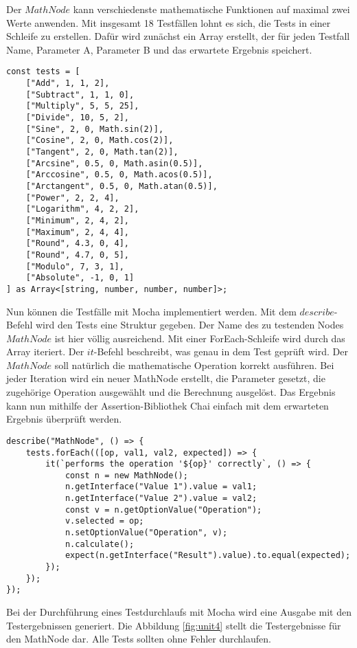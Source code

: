 Der $MathNode$ kann verschiedenste mathematische Funktionen auf maximal zwei Werte anwenden. Mit insgesamt 18 Testfällen lohnt es sich, die Tests in einer Schleife zu erstellen. Dafür wird zunächst ein Array erstellt, der für jeden Testfall Name, Parameter A, Parameter B und das erwartete Ergebnis speichert.

\begin{lstlisting}[caption=Unit-Test: Testdefinition,label=unit2]
const tests = [
    ["Add", 1, 1, 2],
    ["Subtract", 1, 1, 0],
    ["Multiply", 5, 5, 25],
    ["Divide", 10, 5, 2],
    ["Sine", 2, 0, Math.sin(2)],
    ["Cosine", 2, 0, Math.cos(2)],
    ["Tangent", 2, 0, Math.tan(2)],
    ["Arcsine", 0.5, 0, Math.asin(0.5)],
    ["Arccosine", 0.5, 0, Math.acos(0.5)],
    ["Arctangent", 0.5, 0, Math.atan(0.5)],
    ["Power", 2, 2, 4],
    ["Logarithm", 4, 2, 2],
    ["Minimum", 2, 4, 2],
    ["Maximum", 2, 4, 4],
    ["Round", 4.3, 0, 4],
    ["Round", 4.7, 0, 5],
    ["Modulo", 7, 3, 1],
    ["Absolute", -1, 0, 1]
] as Array<[string, number, number, number]>;
\end{lstlisting}

Nun können die Testfälle mit Mocha implementiert werden. Mit dem  $describe$-Befehl wird den Tests eine Struktur gegeben. Der Name des zu testenden Nodes $MathNode$ ist hier völlig ausreichend. Mit einer ForEach-Schleife wird durch das Array iteriert. Der $it$-Befehl beschreibt, was genau in dem Test geprüft wird. Der $MathNode$ soll natürlich die mathematische Operation korrekt ausführen. Bei jeder Iteration wird ein neuer MathNode erstellt, die Parameter gesetzt, die zugehörige Operation ausgewählt und die Berechnung ausgelöst. Das Ergebnis kann nun mithilfe der Assertion-Bibliothek Chai einfach mit dem erwarteten Ergebnis überprüft werden. 

\begin{lstlisting}[caption=Unit-Test: Testdurchführung,label=unit3]
describe("MathNode", () => {
    tests.forEach(([op, val1, val2, expected]) => {
        it(`performs the operation '${op}' correctly`, () => {
            const n = new MathNode();
            n.getInterface("Value 1").value = val1;
            n.getInterface("Value 2").value = val2;
            const v = n.getOptionValue("Operation");
            v.selected = op;
            n.setOptionValue("Operation", v);
            n.calculate();
            expect(n.getInterface("Result").value).to.equal(expected);
        });
    });
});
\end{lstlisting}

Bei der Durchführung eines Testdurchlaufs mit Mocha wird eine Ausgabe mit den Testergebnissen generiert. Die Abbildung \ref{fig:unit4} stellt die Testergebnisse für den MathNode dar. Alle Tests sollten ohne Fehler durchlaufen.

